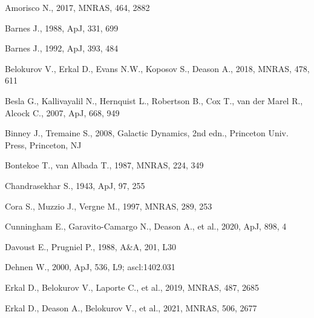 \documentclass[twocolumn]{aastex63}
\begin{document}
\begin{thebibliography}{}

Amorisco N., 2017, MNRAS, 464, 2882

Barnes J., 1988, ApJ, 331, 699

Barnes J., 1992, ApJ, 393, 484

Belokurov V., Erkal D., Evans N.W., Koposov S., Deason A., 2018, MNRAS, 478, 611

Besla G., Kallivayalil N., Hernquist L., Robertson B., Cox T., van der Marel R., Alcock C., 2007, ApJ, 668, 949

Binney J., Tremaine S., 2008, Galactic Dynamics, 2nd edn., Princeton Univ. Press, Princeton, NJ

Bontekoe T., van Albada T., 1987, MNRAS, 224, 349

Chandrasekhar S., 1943, ApJ, 97, 255

Cora S., Muzzio J., Vergne M., 1997, MNRAS, 289, 253

Cunningham E., Garavito-Camargo N., Deason A., et al., 2020, ApJ, 898, 4

Davoust E., Prugniel P., 1988, A\&A, 201, L30

Dehnen W., 2000, ApJ, 536, L9; ascl:1402.031

Erkal D., Belokurov V., Laporte C., et al., 2019, MNRAS, 487, 2685

Erkal D., Deason A., Belokurov V., et al., 2021, MNRAS, 506, 2677


\end{thebibliography}
\end{document}
